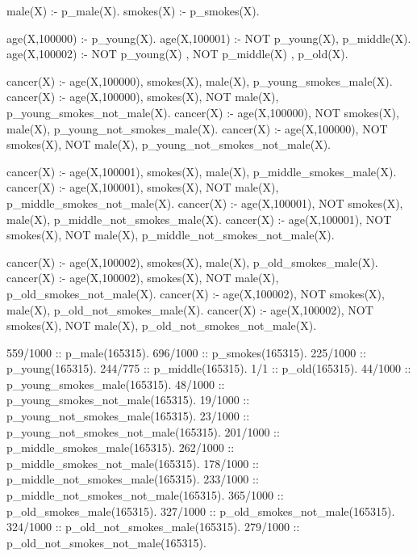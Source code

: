 \documentclass[german,version-2020-11]{uzl-thesis}
\begin{document}
\begin{Pseudocode}[caption={\textit{beliefProgram.pbl} für Krebs in MIMIC III}, label={code:beliefprogrammimic}, numbers=left]
male(X) :- p_male(X). 
smokes(X) :- p_smokes(X).

age(X,100000) :- p_young(X).
age(X,100001) :- NOT p_young(X), p_middle(X).
age(X,100002) :- NOT p_young(X) , NOT p_middle(X) , p_old(X).

cancer(X) :- age(X,100000), smokes(X), male(X), p_young_smokes_male(X).
cancer(X) :- age(X,100000), smokes(X), NOT male(X), p_young_smokes_not_male(X).
cancer(X) :- age(X,100000), NOT smokes(X), male(X), p_young_not_smokes_male(X).
cancer(X) :- age(X,100000), NOT smokes(X), NOT male(X), p_young_not_smokes_not_male(X).

cancer(X) :- age(X,100001), smokes(X), male(X), p_middle_smokes_male(X).
cancer(X) :- age(X,100001), smokes(X), NOT male(X), p_middle_smokes_not_male(X).
cancer(X) :- age(X,100001), NOT smokes(X), male(X), p_middle_not_smokes_male(X).
cancer(X) :- age(X,100001), NOT smokes(X), NOT male(X), p_middle_not_smokes_not_male(X).

cancer(X) :- age(X,100002), smokes(X), male(X), p_old_smokes_male(X).
cancer(X) :- age(X,100002), smokes(X), NOT male(X), p_old_smokes_not_male(X).
cancer(X) :- age(X,100002), NOT smokes(X), male(X), p_old_not_smokes_male(X).
cancer(X) :- age(X,100002), NOT smokes(X), NOT male(X), p_old_not_smokes_not_male(X).

559/1000 :: p_male(165315).
696/1000 :: p_smokes(165315).
225/1000 :: p_young(165315).
244/775 :: p_middle(165315).
1/1 :: p_old(165315).
44/1000 :: p_young_smokes_male(165315).
48/1000 :: p_young_smokes_not_male(165315).
19/1000 :: p_young_not_smokes_male(165315).
23/1000 :: p_young_not_smokes_not_male(165315).
201/1000 :: p_middle_smokes_male(165315).
262/1000 :: p_middle_smokes_not_male(165315).
178/1000 :: p_middle_not_smokes_male(165315).
233/1000 :: p_middle_not_smokes_not_male(165315).
365/1000 :: p_old_smokes_male(165315).
327/1000 :: p_old_smokes_not_male(165315).
324/1000 :: p_old_not_smokes_male(165315).
279/1000 :: p_old_not_smokes_not_male(165315).
\end{Pseudocode}
\end{document}
